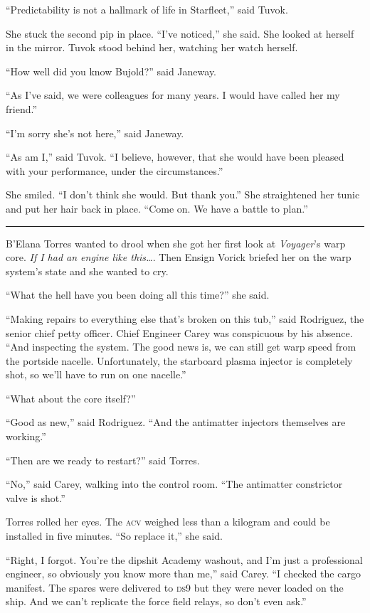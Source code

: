 \documentclass[twoside,letterpaper,12pt]{memoir}
\begin{document}
``Predictability is not a hallmark of life in Starfleet,'' said Tuvok.

She stuck the second pip in place. ``I've noticed,'' she said. She looked at herself in the mirror. Tuvok stood behind her, watching her watch herself.

``How well did you know Bujold?'' said Janeway.

``As I've said, we were colleagues for many years. I would have called her my friend.''

``I'm sorry she's not here,'' said Janeway.

``As am I,'' said Tuvok. ``I believe, however, that she would have been pleased with your performance, under the circumstances.''

She smiled. ``I don't think she would. But thank you.'' She straightened her tunic and put her hair back in place. ``Come on. We have a battle to plan.''

\fancybreak{\rule{3cm}{0.4 pt}}
B'Elana Torres wanted to drool when she got her first look at \textit{Voyager}'s warp core. \textit{If I had an engine like this\ldots }. Then Ensign Vorick briefed her on the warp system's state and she wanted to cry.

``What the hell have you been doing all this time?'' she said.

``Making repairs to everything else that's broken on this tub,'' said Rodriguez, the senior chief petty officer. Chief Engineer Carey was conspicuous by his absence. ``And inspecting the system. The good news is, we can still get warp speed from the portside nacelle. Unfortunately, the starboard plasma injector is completely shot, so we'll have to run on one nacelle.''

``What about the core itself?''

``Good as new,'' said Rodriguez. ``And the antimatter injectors themselves are working.''

``Then are we ready to restart?'' said Torres.

``No,'' said Carey, walking into the control room. ``The antimatter constrictor valve is shot.''

Torres rolled her eyes. The \textsc{acv} weighed less than a kilogram and could be installed in five minutes. ``So replace it,'' she said.

``Right, I forgot. You're the dipshit Academy washout, and I'm just a professional engineer, so obviously you know more than me,'' said Carey. ``I checked the cargo manifest. The spares were delivered to \textsc{ds9} but they were never loaded on the ship. And we can't replicate the force field relays, so don't even ask.''
\end{document}

